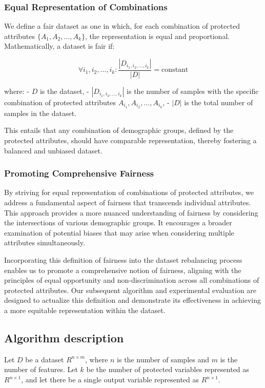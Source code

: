 \documentclass[12pt,a4paper,openright,twoside]{book}
\begin{document}
\subsubsection{Equal Representation of Combinations}

We define a fair dataset as one in which, for each combination of protected attributes $\{A_1, A_2, \ldots, A_k\}$, the representation is equal and proportional. Mathematically, a dataset is fair if:

\[
\forall i_1, i_2, \ldots, i_k: \frac{|D_{i_1, i_2, \ldots, i_k}|}{|D|} = \text{constant}
\]

where:
- $D$ is the dataset,
- $|D_{i_1, i_2, \ldots, i_k}|$ is the number of samples with the specific combination of protected attributes $A_{i_1}, A_{i_2}, \ldots, A_{i_k}$,
- $|D|$ is the total number of samples in the dataset.

This entails that any combination of demographic groups, defined by the protected attributes, should have comparable representation, thereby fostering a balanced and unbiased dataset.

\subsubsection{Promoting Comprehensive Fairness}

By striving for equal representation of combinations of protected attributes, we address a fundamental aspect of fairness that transcends individual attributes. This approach provides a more nuanced understanding of fairness by considering the intersections of various demographic groups. It encourages a broader examination of potential biases that may arise when considering multiple attributes simultaneously.

Incorporating this definition of fairness into the dataset rebalancing process enables us to promote a comprehensive notion of fairness, aligning with the principles of equal opportunity and non-discrimination across all combinations of protected attributes. Our subsequent algorithm and experimental evaluation are designed to actualize this definition and demonstrate its effectiveness in achieving a more equitable representation within the dataset.

\subsection{Algorithm description}

Let \( D \) be a dataset \( R^{n \times m} \), where \( n \) is the number of samples and \( m \) is the number of features. Let \( k \) be the number of protected variables represented as \( R^{n \times 1} \), and let there be a single output variable represented as \( R^{n \times 1} \).
\end{document}

